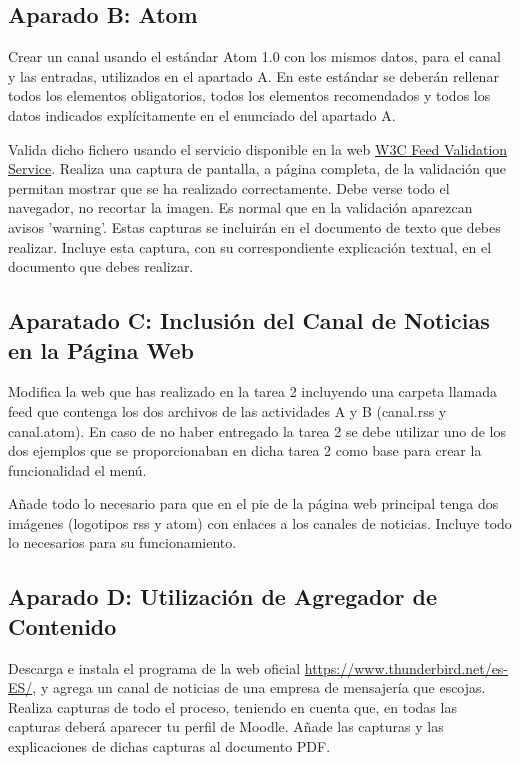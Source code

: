 \subsection{Aparado B: Atom}
Crear un canal usando el estándar Atom 1.0 con los mismos datos, para el canal y las entradas, utilizados en el apartado A. En este estándar se deberán rellenar todos los elementos obligatorios, todos los elementos recomendados y todos los datos indicados explícitamente en el enunciado del apartado A.

Valida dicho fichero usando el servicio disponible en la web \href{https://validator.w3.org/feed/#validate_by_input}{W3C Feed Validation Service}. Realiza una captura de pantalla, a página completa, de la validación que permitan mostrar que se ha realizado correctamente. Debe verse todo el navegador, no recortar la imagen. Es normal que en la validación aparezcan avisos 'warning'. Estas capturas se incluirán en el documento de texto que debes realizar. Incluye esta captura, con su correspondiente explicación textual, en el documento que debes realizar.

\subsection{Aparatado C: Inclusión del Canal de Noticias en la Página Web}
Modifica la web que has realizado en la tarea 2 incluyendo una carpeta llamada feed que contenga los dos archivos de las actividades A y B (canal.rss y canal.atom). En caso de no haber entregado la tarea 2 se debe utilizar uno de los dos ejemplos que se proporcionaban en dicha tarea 2 como base para crear la funcionalidad el menú.

Añade todo lo necesario para que en el pie de la página web principal tenga dos imágenes (logotipos rss y atom) con enlaces a los canales de noticias. Incluye todo lo necesarios para su funcionamiento.

\subsection{Aparado D: Utilización de Agregador de Contenido}
Descarga e instala el programa de la web oficial \url{https://www.thunderbird.net/es-ES/}, y  agrega un canal de noticias de una empresa de mensajería que escojas. Realiza capturas de todo el proceso, teniendo en cuenta que, en todas las capturas deberá aparecer tu perfil de Moodle. Añade las capturas y las explicaciones de dichas capturas al documento PDF.


